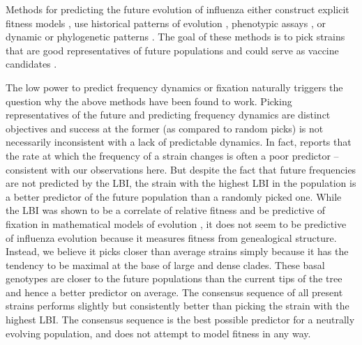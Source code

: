 \documentclass[reprint,amsmath,amssymb,superscriptaddress,showpacs,rmp]{revtex4-1}
\begin{document}

Methods for predicting the future evolution of influenza either construct explicit fitness models \citep{luksza_predictive_2014,huddleston_integrating_2020}, use historical patterns of evolution \citep{luksza_predictive_2014,bush_predicting_1999}, phenotypic assays \citep{neher_prediction_2016,steinbruck_inference_2012}, or dynamic or phylogenetic patterns \citep{neher_predicting_2014,klingen_sweep_2018}.
The goal of these methods is to pick strains that are good representatives of future populations and could serve as vaccine candidates \citep{morris2018predictive}.


The low power to predict frequency dynamics or fixation naturally triggers the question why the above methods have been found to work.
Picking representatives of the future and predicting frequency dynamics are distinct objectives and success at the former (as compared to random picks) is not necessarily inconsistent with a lack of predictable dynamics.
In fact, \citep{huddleston_integrating_2020} reports that the rate at which the frequency of a strain changes is often a poor predictor -- consistent with our observations here.
But despite the fact that future frequencies are not predicted by the LBI, the strain with the highest LBI in the population is a better predictor of the future population than a randomly picked one.
While the LBI was shown to be a correlate of relative fitness and be predictive of fixation in mathematical models of evolution \citep{neher_predicting_2014}, it does not seem to be predictive of influenza evolution because it measures fitness from genealogical structure.
Instead, we believe it picks closer than average strains simply because it has the tendency to be maximal at the base of large and dense clades.
These basal genotypes are closer to the future populations than the current tips of the tree and hence a better predictor on average.
The consensus sequence of all present strains performs slightly but consistently better than picking the strain with the highest LBI.
The consensus sequence is the best possible predictor for a neutrally evolving population, and does not attempt to model fitness in any way.
\end{document}
